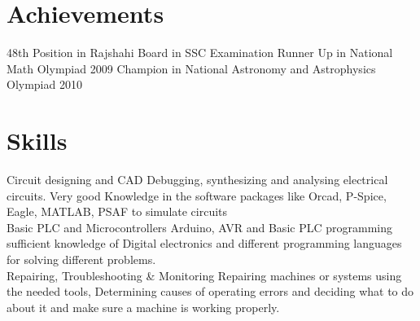 \documentclass[]{friggeri-cv}
\begin{document}
\section{Achievements}
\begin{entrylist}
  \entry
    { }
    {48th Position in Rajshahi Board in SSC Examination}
    { }
    { }
  \entry
    { }
    {Runner Up in National Math Olympiad 2009}
    { }
    { }
  \entry
    { }
    {Champion in National Astronomy and Astrophysics Olympiad 2010}
    { }
    { }
\end{entrylist}

\newpage

\section{Skills}
\begin{entrylist}
  \entry
    { }
    {Circuit designing and CAD}
    {Debugging, synthesizing and analysing electrical circuits.}
    {Very good Knowledge in the software packages like Orcad, P-Spice, Eagle, MATLAB, PSAF to simulate circuits \\}
  \entry
    { }
    {Basic PLC and Microcontrollers}
    {Arduino, AVR and Basic PLC programming}
    {sufficient knowledge of Digital electronics and different programming languages for solving different problems.\\}
  \entry
    { }
    {Repairing, Troubleshooting \& Monitoring}
    { }
    {Repairing machines or systems using the needed tools, Determining causes of operating errors and deciding what to do about it and make sure a machine is working properly.}    
\end{entrylist}
\end{document}
